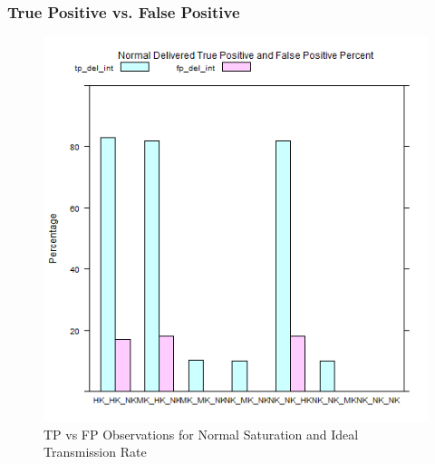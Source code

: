 \subsubsection{True Positive vs. False Positive}
	
	\begin{figure}[H]
	\centering
	\includegraphics[width=\textwidth]{Chap7/figures/plots/normal_ideal/tpvsfp_percent.png}
	\caption{TP vs FP Observations for Normal Saturation and Ideal Transmission Rate}
	\label{fig:sim:res:norm:ideal:tpfp}
	\end{figure}

